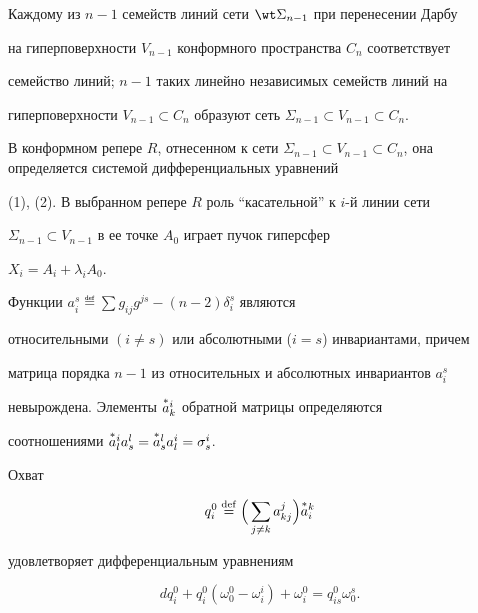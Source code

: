  


 


Каждому из $n-1$ семейств линий сети $\wt\Sigma_{n-1}$ при перенесении Дарбу 


на гиперповерхности $V_{n-1}$ конформного пространства $C_n$ соответствует 


семейство линий; $n-1$ таких линейно независимых семейств линий на 


гиперповерхности $V_{n-1}\subset C_n$ образуют сеть $\Sigma_{n-1}\subset 


V_{n-1}\subset C_n$. 


 


В конформном репере $R$, отнесенном к сети $\Sigma_{n-1}\subset 


V_{n-1}\subset C_n$, она определяется системой дифференциальных уравнений 


(1), (2). В выбранном репере $R$ роль ``касательной'' к $i$-й линии сети 


$\Sigma_{n-1}\subset V_{n-1}$ в ее точке $A_0$ играет пучок гиперсфер 


$X_i=A_i+\lambda_i A_0$. 


 


Функции $a^s_i\eqdef \sum g_{ij}g^{js}-(n-2)\delta^s_i$ являются 


относительными $(i\ne s)$ или абсолютными ($i=s$) инвариантами, причем 


матрица порядка $n-1$ из относительных и абсолютных инвариантов $a^s_i$ 


невырождена. Элементы $\overset{*}{a}{}^i_k$ обратной матрицы определяются 


соотношениями $\overset{*}{a}{}^i_la^l_s=\overset{*}{a}{}^l_s a^i_l=\sigma^i_s$. 


 


Охват 


\begin{equation} 


q^0_i\eqdef\Big(\sum_{j\ne k}a^j_{kj}\Big)\up{*}{a}^k_i 


\end{equation} 


удовлетворяет дифференциальным уравнениям 


\begin{equation} 


dq^0_i+q^0_i(\omega^0_0-\omega^i_i)+\omega^0_i= 


q^0_{is}\omega^s_0. 


\end{equation} 


